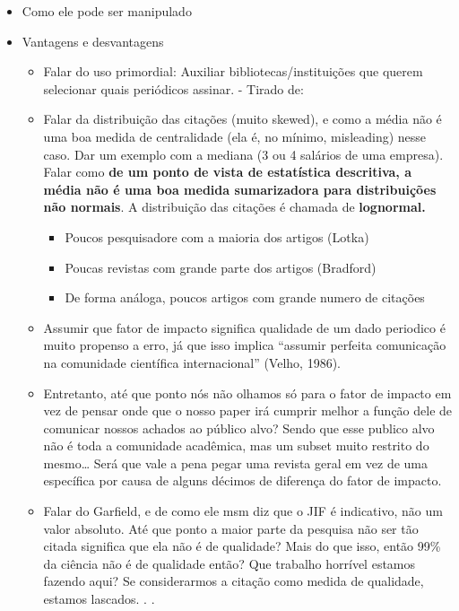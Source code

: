\documentclass[11pt]{article}
\begin{document}
\begin{itemize}
\begin{itemize}
\begin{itemize}
\begin{itemize}
\item Como ele pode ser manipulado
\item Vantagens e desvantagens
\begin{itemize}
\item Falar do uso primordial: Auxiliar bibliotecas/instituições que querem selecionar quais periódicos assinar. - Tirado de: \cite{wallin2005}
\item Falar da distribuição das citações (muito skewed), e como a média não é uma boa medida de centralidade (ela é, no mínimo, misleading) nesse caso. Dar um exemplo com a mediana (3 ou 4 salários de uma empresa). Falar como \textbf{de um ponto de vista de estatística descritiva, a média não é uma boa medida sumarizadora para distribuições não normais}. A distribuição das citações é chamada de \textbf{lognormal.}
\begin{itemize}
\item Poucos pesquisadore com a maioria dos artigos (Lotka)
\item Poucas revistas com grande parte dos artigos (Bradford)
\item De forma análoga, poucos artigos com grande numero de citações
\end{itemize}
\item Assumir que fator de impacto significa qualidade de um dado periodico é muito propenso a erro, já que isso implica “assumir perfeita comunicação na comunidade científica internacional” (Velho, 1986).
\item Entretanto, até que ponto nós não olhamos só para o fator de impacto em vez de pensar onde que o nosso paper irá cumprir melhor a função dele de comunicar nossos achados ao público alvo? Sendo que esse publico alvo não é toda a comunidade acadêmica, mas um subset muito restrito do mesmo\ldots{} Será que vale a pena pegar uma revista geral em vez de uma específica por causa de alguns décimos de diferença do fator de impacto.
\item Falar do Garfield, e de como ele msm diz que o JIF é indicativo, não um valor absoluto. Até que ponto a maior parte da pesquisa não ser tão citada significa que ela não é de qualidade? Mais do que isso, então 99\% da ciência não é de qualidade então? Que trabalho horrível estamos fazendo aqui? Se considerarmos a citação como medida de qualidade, estamos lascados. . .
\end{itemize}


\end{itemize}
\end{itemize}
\end{itemize}
\end{itemize}
\end{document}

